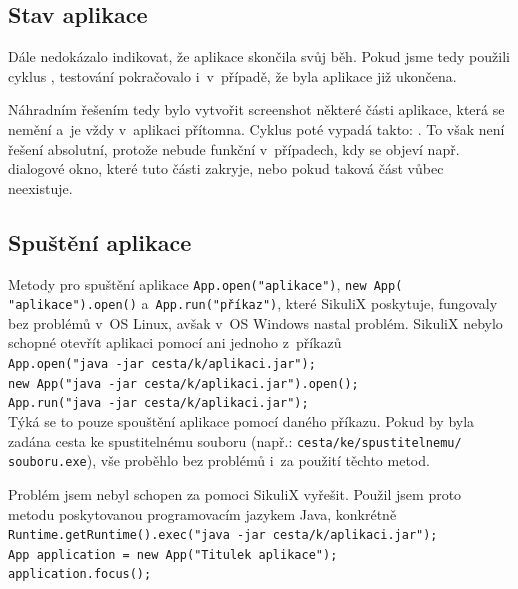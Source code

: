 		\subsection{Stav aplikace}
		Dále nedokázalo indikovat, že aplikace skončila svůj běh. Pokud jsme tedy použili cyklus , testování pokračovalo i~v~případě, že byla aplikace již ukončena.
	
		Náhradním řešením tedy bylo vytvořit screenshot některé části aplikace, která se nemění a~je vždy v~aplikaci přítomna. Cyklus poté vypadá takto: . To však není řešení absolutní, protože nebude funkční v~případech, kdy se objeví např. dialogové okno, které tuto části zakryje, nebo pokud taková část vůbec neexistuje.
		
		\subsection{Spuštění aplikace}
		Metody pro spuštění aplikace \texttt{App.open("aplikace")}, \texttt{new App(\\"aplikace").open()} a~\texttt{App.run("příkaz")}, které SikuliX poskytuje, fungovaly bez problémů v~OS Linux, avšak v~OS Windows nastal problém. SikuliX nebylo schopné otevřít aplikaci pomocí ani jednoho z~příkazů\\[0.2cm]
		\texttt{App.open("java -jar cesta/k/aplikaci.jar");\\
		new App("java -jar cesta/k/aplikaci.jar").open();\\
		App.run("java -jar cesta/k/aplikaci.jar");}\\[0.2cm]
		Týká se to pouze spouštění aplikace pomocí daného příkazu. Pokud by byla zadána cesta ke spustitelnému souboru (např.: \texttt{cesta/ke/spustitelnemu/\\souboru.exe}), vše proběhlo bez problémů i~za použití těchto metod.
		
		Problém jsem nebyl schopen za pomoci SikuliX vyřešit. Použil jsem proto metodu poskytovanou programovacím jazykem Java, konkrétně\\[0.2cm]
		\texttt{Runtime.getRuntime().exec("java -jar cesta/k/aplikaci.jar");\\
		App application = new App("Titulek aplikace");\\
		application.focus();}